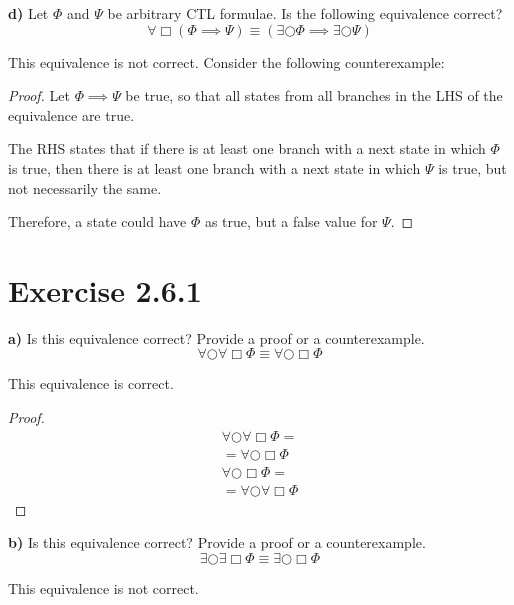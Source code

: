 \documentclass[titlepage, letterpaper, fleqn]{article}
\begin{document}
{\large \textbf{d)} Let \(\Phi\) and \(\Psi\) be arbitrary CTL formulae. Is the following equivalence correct?
\[\forall \Box(\Phi \implies \Psi) \equiv (\exists \bigcirc \Phi \implies \exists \bigcirc \Psi)\]}

This equivalence is not correct. Consider the following counterexample:

\begin{proof}
Let \(\Phi \implies \Psi\) be true, so that all states from all branches in the LHS of the equivalence are true.

The RHS states that if there is at least one branch with a next state  in which \(\Phi\) is true, then there is at least one branch with a next state in which \(\Psi\) is true, but not necessarily the same.

Therefore, a state could have \(\Phi\) as true, but a false value for \(\Psi\).
\end{proof}

\pagebreak

\section{Exercise 2.6.1}

{\large \textbf{a)} Is this equivalence correct? Provide a proof or a counterexample.
\[\forall \bigcirc \forall \Box \Phi \equiv \forall \bigcirc \Box \Phi\]}

This equivalence is correct.

\begin{proof}
\begin{align*}
& \forall \bigcirc \forall \Box \Phi =
\\ & = \forall \bigcirc \Box \Phi & \tag*{Quantifier absorption}
\end{align*}
\begin{align*}
& \forall \bigcirc \Box \Phi =
\\ & = \forall \bigcirc \forall \Box \Phi & \tag*{Quantifier absorption}
\end{align*}
\end{proof}

{\large \textbf{b)} Is this equivalence correct? Provide a proof or a counterexample.
\[\exists \bigcirc \exists \Box \Phi \equiv \exists \bigcirc \Box \Phi\]}

This equivalence is not correct.
\end{document}
